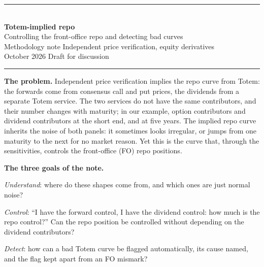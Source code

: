 \thispagestyle{plain}
\begin{center}
{\color{accentdark}\rule{\linewidth}{0.8pt}}\\[10pt]
{\LARGE\bfseries Totem-implied repo}\\[6pt]
{\large Controlling the front-office repo and detecting bad curves}\\[8pt]
{\normalsize\color{ink2} Methodology note \quad\textbullet\quad Independent price verification, equity
derivatives}\\[2pt]
{\normalsize\color{ink2} October 2026 \quad\textbullet\quad Draft for discussion}\\[4pt]
{\color{accentdark}\rule{\linewidth}{0.8pt}}
\end{center}

\begin{bref}
\textbf{The problem.} Independent price verification implies the repo curve from Totem: the forwards come from
consensus call and put prices, the dividends from a separate Totem service. The two services do not have the same
contributors, and their number changes with maturity; in our example, \vRunNoptShort{} option contributors and
\vRunNdivShort{} dividend contributors at the short end, \vRunNoptLong{} and \vRunNdivLong{} at five years. The implied
repo curve inherits the noise of both panels: it sometimes looks irregular, or jumps from one maturity to the next for
no market reason. Yet this is the curve that, through the sensitivities, controls the front-office (FO) repo positions.

\medskip
\textbf{The three goals of the note.}
\begin{description}[leftmargin=1.1cm,labelwidth=0.9cm,labelsep=0.2cm,itemsep=1pt]
\item[G1] \emph{Understand}: where do these shapes come from, and which ones are just normal noise?
\item[G2] \emph{Control}: ``I have the forward control, I have the dividend control: how much is the repo control?''
Can the repo position be controlled without depending on the dividend contributors?
\item[G3] \emph{Detect}: how can a bad Totem curve be flagged automatically, its cause named, and the flag kept apart
from an FO mismark?
\end{description}


\end{bref}
